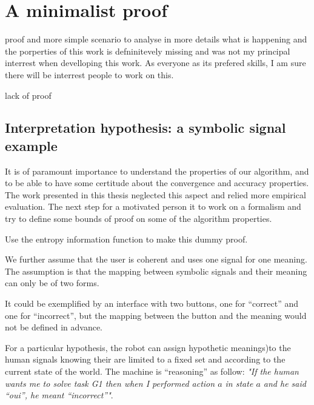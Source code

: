 \section{A minimalist proof}

proof and more simple scenario to analyse in more details what is happening and the porperties of this work is defninitevely missing and was not my principal interrest when develloping this work. As everyone as its prefered skills, I am sure there will be interrest people to work on this.

lack of proof

\subsection{Interpretation hypothesis: a symbolic signal example}

It is of paramount importance to understand the properties of our algorithm, and to be able to have some certitude about the convergence and accuracy properties. The work presented in this thesis neglected this aspect and relied more empirical evaluation. The next step for a motivated person it to work on a formalism and try to define some bounds of proof on some of the algorithm properties.

Use the entropy information function to make this dummy proof.

We further assume that the user is coherent and uses one signal for one meaning. The assumption is that the mapping between symbolic signals and their meaning can only be of two forms.

It could be exemplified by an interface with two buttons, one for ``correct'' and one for ``incorrect'', but the mapping between the button and the meaning would not be defined in advance.


For a particular hypothesis, the robot can assign hypothetic meanings)to the human signals knowing their are limited to a fixed set and according to the current state of the world. The machine is ``reasoning'' as follow: \emph{"If the human wants me to solve task G1 then when I performed action $a$ in state $a$ and he said ``oui'', he meant ``incorrect''"}. 


